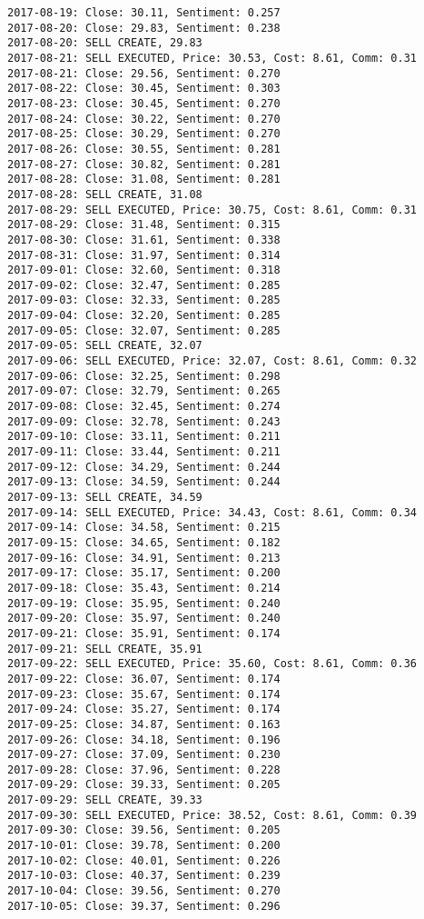 \documentclass[11pt]{article}
\begin{document}
\begin{Verbatim}[commandchars=\\\{\}]
2017-08-19: Close: 30.11, Sentiment: 0.257
2017-08-20: Close: 29.83, Sentiment: 0.238
2017-08-20: SELL CREATE, 29.83
2017-08-21: SELL EXECUTED, Price: 30.53, Cost: 8.61, Comm: 0.31
2017-08-21: Close: 29.56, Sentiment: 0.270
2017-08-22: Close: 30.45, Sentiment: 0.303
2017-08-23: Close: 30.45, Sentiment: 0.270
2017-08-24: Close: 30.22, Sentiment: 0.270
2017-08-25: Close: 30.29, Sentiment: 0.270
2017-08-26: Close: 30.55, Sentiment: 0.281
2017-08-27: Close: 30.82, Sentiment: 0.281
2017-08-28: Close: 31.08, Sentiment: 0.281
2017-08-28: SELL CREATE, 31.08
2017-08-29: SELL EXECUTED, Price: 30.75, Cost: 8.61, Comm: 0.31
2017-08-29: Close: 31.48, Sentiment: 0.315
2017-08-30: Close: 31.61, Sentiment: 0.338
2017-08-31: Close: 31.97, Sentiment: 0.314
2017-09-01: Close: 32.60, Sentiment: 0.318
2017-09-02: Close: 32.47, Sentiment: 0.285
2017-09-03: Close: 32.33, Sentiment: 0.285
2017-09-04: Close: 32.20, Sentiment: 0.285
2017-09-05: Close: 32.07, Sentiment: 0.285
2017-09-05: SELL CREATE, 32.07
2017-09-06: SELL EXECUTED, Price: 32.07, Cost: 8.61, Comm: 0.32
2017-09-06: Close: 32.25, Sentiment: 0.298
2017-09-07: Close: 32.79, Sentiment: 0.265
2017-09-08: Close: 32.45, Sentiment: 0.274
2017-09-09: Close: 32.78, Sentiment: 0.243
2017-09-10: Close: 33.11, Sentiment: 0.211
2017-09-11: Close: 33.44, Sentiment: 0.211
2017-09-12: Close: 34.29, Sentiment: 0.244
2017-09-13: Close: 34.59, Sentiment: 0.244
2017-09-13: SELL CREATE, 34.59
2017-09-14: SELL EXECUTED, Price: 34.43, Cost: 8.61, Comm: 0.34
2017-09-14: Close: 34.58, Sentiment: 0.215
2017-09-15: Close: 34.65, Sentiment: 0.182
2017-09-16: Close: 34.91, Sentiment: 0.213
2017-09-17: Close: 35.17, Sentiment: 0.200
2017-09-18: Close: 35.43, Sentiment: 0.214
2017-09-19: Close: 35.95, Sentiment: 0.240
2017-09-20: Close: 35.97, Sentiment: 0.240
2017-09-21: Close: 35.91, Sentiment: 0.174
2017-09-21: SELL CREATE, 35.91
2017-09-22: SELL EXECUTED, Price: 35.60, Cost: 8.61, Comm: 0.36
2017-09-22: Close: 36.07, Sentiment: 0.174
2017-09-23: Close: 35.67, Sentiment: 0.174
2017-09-24: Close: 35.27, Sentiment: 0.174
2017-09-25: Close: 34.87, Sentiment: 0.163
2017-09-26: Close: 34.18, Sentiment: 0.196
2017-09-27: Close: 37.09, Sentiment: 0.230
2017-09-28: Close: 37.96, Sentiment: 0.228
2017-09-29: Close: 39.33, Sentiment: 0.205
2017-09-29: SELL CREATE, 39.33
2017-09-30: SELL EXECUTED, Price: 38.52, Cost: 8.61, Comm: 0.39
2017-09-30: Close: 39.56, Sentiment: 0.205
2017-10-01: Close: 39.78, Sentiment: 0.200
2017-10-02: Close: 40.01, Sentiment: 0.226
2017-10-03: Close: 40.37, Sentiment: 0.239
2017-10-04: Close: 39.56, Sentiment: 0.270
2017-10-05: Close: 39.37, Sentiment: 0.296

\end{Verbatim}
\end{document}
